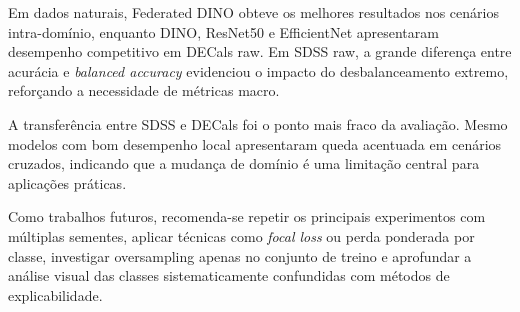 \documentclass[conference]{IEEEtran}
\begin{document}
Em dados naturais, Federated DINO obteve os melhores resultados nos cenários intra-domínio, enquanto DINO, ResNet50 e EfficientNet apresentaram desempenho competitivo em DECals raw. Em SDSS raw, a grande diferença entre acurácia e \textit{balanced accuracy} evidenciou o impacto do desbalanceamento extremo, reforçando a necessidade de métricas macro.

A transferência entre SDSS e DECals foi o ponto mais fraco da avaliação. Mesmo modelos com bom desempenho local apresentaram queda acentuada em cenários cruzados, indicando que a mudança de domínio é uma limitação central para aplicações práticas.

Como trabalhos futuros, recomenda-se repetir os principais experimentos com múltiplas sementes, aplicar técnicas como \textit{focal loss} ou perda ponderada por classe, investigar oversampling apenas no conjunto de treino e aprofundar a análise visual das classes sistematicamente confundidas com métodos de explicabilidade.
\end{document}
